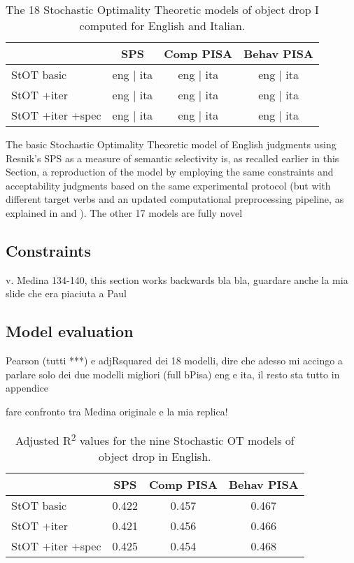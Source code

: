 \begin{table}[htb] %
\caption{The 18 Stochastic Optimality Theoretic models of object drop I computed for English and Italian.}
\begin{tabular}{l|ccc}
& SPS & Comp PISA & Behav PISA \\
\hline
StOT basic & eng | ita          & eng | ita   & eng | ita   \\
StOT +iter & eng | ita  & eng | ita & eng | ita \\
StOT +iter +spec & eng | ita   & eng | ita   & eng | ita  
\end{tabular}
\end{table}

The basic Stochastic Optimality Theoretic model of English judgments using Resnik's SPS as a measure of semantic selectivity is, as recalled earlier in this Section, a reproduction of the model by \textcite{Medina2007} employing the same constraints and acceptability judgments based on the same experimental protocol (but with different target verbs and an updated computational preprocessing pipeline, as explained in  and ). The other 17 models are fully novel


\subsection{Constraints} 

v. Medina 134-140, this section works backwards bla bla, guardare anche la mia slide che era piaciuta a Paul


\subsection{Model evaluation} 

Pearson (tutti ***) e adjRsquared dei 18 modelli, dire che adesso mi accingo a parlare solo dei due modelli migliori (full bPisa) eng e ita, il resto sta tutto in appendice

fare confronto tra Medina originale e la mia replica!

\begin{table}[htb] %
\caption{Adjusted R\textsuperscript{2} values for the nine Stochastic OT models of object drop in English.}
\begin{tabular}{l|ccc}
& SPS & Comp PISA & Behav PISA \\
\hline
StOT basic           & 0.422        & 0.457     & 0.467      \\
StOT +iter           & 0.421        & 0.456     & 0.466      \\
StOT +iter +spec     & 0.425        & 0.454     & 0.468  
\end{tabular}
\end{table}

